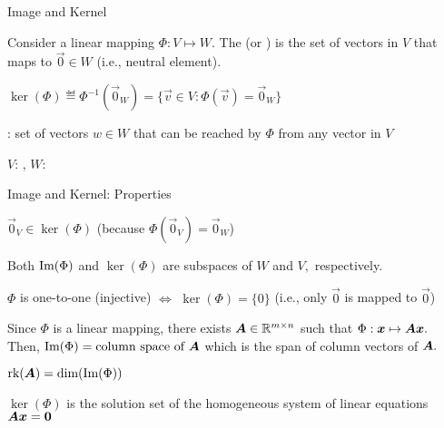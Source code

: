 \documentclass[fleqn,aspectratio=169]{beamer}
\begin{document}
\begin{frame}{Image and Kernel}

\plitemsep 0.1in

\bci 


\item Consider a linear mapping $\Phi: V \mapsto W.$ The  (or ) is the set of vectors in $V$ that maps to $\vec{0} \in W$ (i.e., neutral element).

\medskip
{}  $\ker(\Phi) \eqdef \Phi^{-1}(\vec{0}_W) = \{\vec{v} \in V : \Phi(\vec{v}) = \vec{0}_W \}$

\item {}: set of vectors $w \in W$ that can be reached by $\Phi$ from any vector in $V$

\item $V$: , $W$: 

\centering
{}

\eci

\end{frame}

\begin{frame}{Image and Kernel: Properties}

\plitemsep 0.2in

\bci 

\item $\vec{0}_V \in \ker(\Phi)$ (because $\Phi(\vec{0}_V) = \vec{0}_W$)
\item Both $\text{Im}(\Phi)$ and $\ker(\Phi)$ are subspaces of $W$ and $V,$ respectively. 
\item $\Phi$ is one-to-one (injective) $\Longleftrightarrow$ $\ker(\Phi) = \{0\}$ (i.e., only $\vec{0}$ is mapped to $\vec{0}$)

\item Since $\Phi$ is a linear mapping, there exists $\bm{A} \in {\mathbb R}^{m \times n}$ such that $\Phi: \bm{x} \mapsto \bm{A}\bm{x}.$ Then, $\text{Im}(\Phi) = \text{column space of } \bm{A}$ which is the span of column vectors of $\bm{A}.$

\item $\text{rk}(\bm{A}) = \text{dim}(\text{Im}(\Phi))$

\item $\ker(\Phi)$ is the solution set of the homogeneous system of linear equations $\bm{A}\bm{x} = \bm{0}$
\eci

\end{frame}
\end{document}
